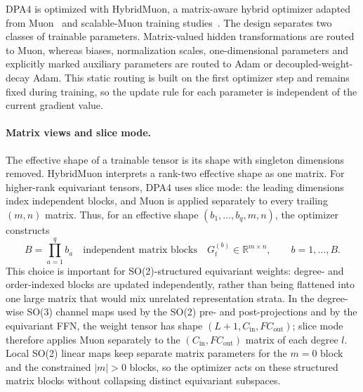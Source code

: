 DPA4 is optimized with HybridMuon, a matrix-aware hybrid optimizer adapted from Muon~\cite{jordan2024muon} and scalable-Muon training studies~\cite{liu2025muon}.
The design separates two classes of trainable parameters.
Matrix-valued hidden transformations are routed to Muon, whereas biases, normalization scales, one-dimensional parameters and explicitly marked auxiliary parameters are routed to Adam or decoupled-weight-decay Adam.
This static routing is built on the first optimizer step and remains fixed during training, so the update rule for each parameter is independent of the current gradient value.

\paragraph{Matrix views and slice mode.}
The effective shape of a trainable tensor is its shape with singleton dimensions removed.
HybridMuon interprets a rank-two effective shape as one matrix.
For higher-rank equivariant tensors, DPA4 uses slice mode: the leading dimensions index independent blocks, and Muon is applied separately to every trailing $(m,n)$ matrix.
Thus, for an effective shape $(b_1,\ldots,b_q,m,n)$, the
optimizer constructs
\begin{equation}
    B=\prod_{a=1}^{q}b_a \quad\text{independent matrix blocks}\quad G_t^{(b)}\in\mathbb{R}^{m\times n}, \qquad b=1,\ldots,B.
    \label{eq:sm-muon-slice-view}
\end{equation}
This choice is important for SO(2)-structured equivariant weights: degree- and order-indexed blocks are updated independently, rather than being flattened into one large matrix that would mix unrelated representation strata.
In the degree-wise SO(3) channel maps used by the SO(2) pre- and post-projections and by the equivariant FFN, the weight tensor has shape $(L+1,C_{\mathrm{in}},F C_{\mathrm{out}})$; slice mode therefore applies Muon separately to the $(C_{\mathrm{in}},F C_{\mathrm{out}})$ matrix of each degree $l$.
Local SO(2) linear maps keep separate matrix parameters for the $m=0$ block and the constrained $|m|>0$ blocks, so the optimizer acts on these structured matrix blocks without collapsing distinct equivariant subspaces.

